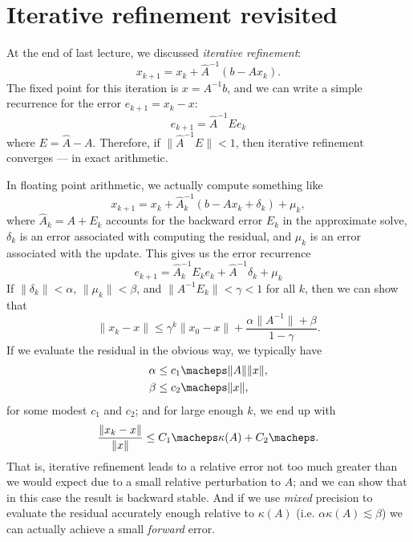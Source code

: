\section{Iterative refinement revisited}

At the end of last lecture, we discussed {\em iterative refinement}:
\[
  x_{k+1} = x_k + \hat{A}^{-1} (b - A x_{k}).
\]
The fixed point for this iteration is $x = A^{-1} b$, and we can write
a simple recurrence for the error $e_{k+1} = x_k-x$:
\[
  e_{k+1} = \hat{A}^{-1} E e_k
\]
where $E = \hat{A}-A$.  Therefore, if $\|\hat{A}^{-1} E\|<1$, then
iterative refinement converges --- in exact arithmetic.

In floating point arithmetic, we actually compute something like
\[
  x_{k+1} = x_k + \hat{A}_k^{-1} (b - A x_{k} + \delta_k) + \mu_k,
\]
where $\hat{A}_k = A + E_k$ accounts for the backward
error $E_k$ in the approximate solve,
$\delta_k$ is an error associated with computing the residual, and
$\mu_k$ is an error associated with the update.  This gives us the
error recurrence
\[
  e_{k+1} = \hat{A}_k^{-1} E_k e_k + \hat{A}^{-1} \delta_k + \mu_k
\]
If $\|\delta_k\| < \alpha$, $\|\mu_k\| < \beta$,
and $\|A^{-1} E_k\| < \gamma < 1$ for all $k$, then
we can show that
\[
  \|x_k-x\| \leq
    \gamma^k \|x_0-x\| +
    \frac{ \alpha \|A^{-1}\| + \beta }{1 - \gamma}.
\]
If we evaluate the residual in the obvious way, we typically have
\begin{align*}
  \alpha & \leq c_1 \macheps \|A\| \|x\|, \\
  \beta & \leq c_2 \macheps \|x\|,
\end{align*}
for some modest $c_1$ and $c_2$; and for large enough $k$, we end up with
\[
  \frac{\|x_k-x\|}{\|x\|} \leq C_1 \macheps \kappa(A) + C_2 \macheps.
\]
That is, iterative refinement leads to a relative error not too much
greater than we would expect due to a small relative perturbation to $A$;
and we can show that in this case the result is backward stable.
And if we use {\em mixed} precision to evaluate the residual accurately
enough relative to $\kappa(A)$ (i.e. $\alpha \kappa(A) \lesssim \beta$)
we can actually achieve a small {\em forward} error.

